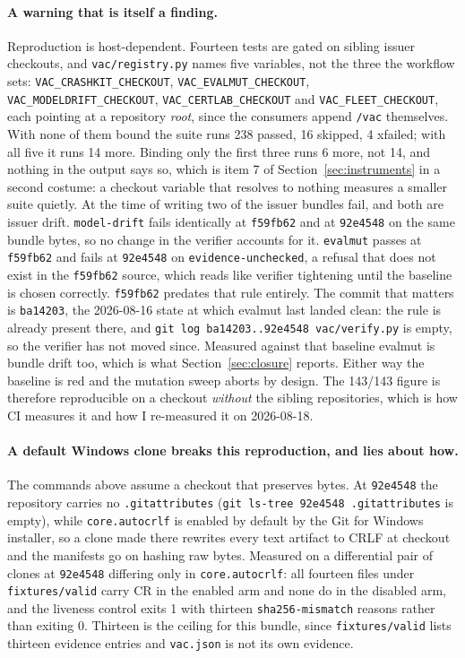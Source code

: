\documentclass[11pt]{article}
\begin{document}
\paragraph{A warning that is itself a finding.} Reproduction is host-dependent. Fourteen tests
are gated on sibling issuer checkouts, and \texttt{vac/registry.py} names five variables, not
the three the workflow sets: \texttt{VAC\_CRASHKIT\_CHECKOUT}, \texttt{VAC\_EVALMUT\_CHECKOUT},
\texttt{VAC\_MODELDRIFT\_CHECKOUT}, \texttt{VAC\_CERTLAB\_CHECKOUT} and
\texttt{VAC\_FLEET\_CHECKOUT}, each pointing at a repository \emph{root}, since the consumers
append \texttt{/vac} themselves. With none of them bound the suite runs 238 passed, 16 skipped,
4 xfailed; with all five it runs 14 more. Binding only the first three runs 6 more, not 14, and
nothing in the output says so, which is item 7 of Section~\ref{sec:instruments} in a second
costume: a checkout variable that resolves to nothing measures a smaller suite quietly. At the
time of writing two of the issuer bundles fail, and both are issuer drift.
\texttt{model-drift} fails identically at \texttt{f59fb62} and at \texttt{92e4548} on the same
bundle bytes, so no change in the verifier accounts for it. \texttt{evalmut} passes at
\texttt{f59fb62} and fails at \texttt{92e4548} on \texttt{evidence-unchecked}, a refusal that
does not exist in the \texttt{f59fb62} source, which reads like verifier tightening until the
baseline is chosen correctly. \texttt{f59fb62} predates that rule entirely. The commit that
matters is \texttt{ba14203}, the 2026-08-16 state at which evalmut last landed clean: the rule
is already present there, and \texttt{git log ba14203..92e4548 vac/verify.py} is empty, so
the verifier has not moved since. Measured against that baseline evalmut is bundle drift too,
which is what Section~\ref{sec:closure} reports. Either way the baseline is red and the mutation sweep aborts by
design. The 143/143 figure is therefore reproducible on a checkout \emph{without} the sibling
repositories, which is how CI measures it and how I re-measured it on 2026-08-18.

\paragraph{A default Windows clone breaks this reproduction, and lies about how.} The commands
above assume a checkout that preserves bytes. At \texttt{92e4548} the repository carries no
\texttt{.gitattributes} (\texttt{git ls-tree 92e4548 .gitattributes} is empty),
while \texttt{core.autocrlf} is enabled by default by the Git for Windows installer, so a clone
made there rewrites every text artifact to CRLF at checkout and the manifests go on hashing raw
bytes. Measured on a differential pair of clones at \texttt{92e4548} differing only in
\texttt{core.autocrlf}: all fourteen files under \texttt{fixtures/valid} carry CR in the enabled arm
and none do in the disabled arm, and the liveness control exits 1 with thirteen
\texttt{sha256-mismatch} reasons rather than exiting 0. Thirteen is the ceiling for this bundle,
since \texttt{fixtures/valid} lists thirteen evidence entries and \texttt{vac.json} is not its
own evidence.
\end{document}
